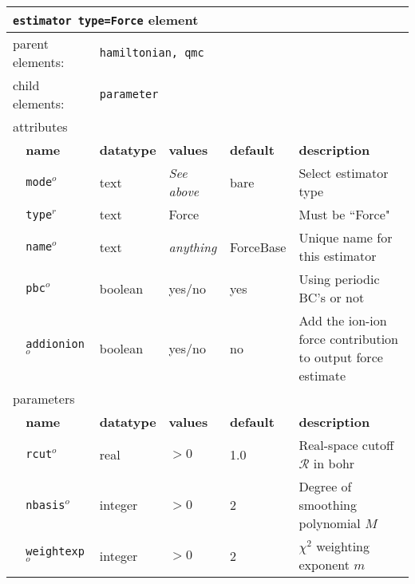 \begin{table}[h]
\begin{center}
\begin{tabularx}{\textwidth}{l l l l l X }
\hline
\multicolumn{6}{l}{\texttt{estimator type=Force} element} \\
\hline
\multicolumn{2}{l}{parent elements:} & \multicolumn{4}{l}{\texttt{hamiltonian, qmc}}\\
\multicolumn{2}{l}{child  elements:} & \multicolumn{4}{l}{\texttt{parameter}}\\
\multicolumn{2}{l}{attributes}  & \multicolumn{4}{l}{}\\
   & \bfseries name       & \bfseries datatype & \bfseries values  & \bfseries default   & \bfseries description \\
   &   \texttt{mode}$^o$      &  text              & \textit{See above}        & bare          & Select estimator type\\
   &   \texttt{type}$^r$      &  text              &  Force            &               & Must be ``Force"         \\
   &   \texttt{name}$^o$      &  text              & \textit{anything}         & ForceBase     & Unique name for this estimator\\
   &   \texttt{pbc}$^o$       &  boolean           & yes/no                    & yes           & Using periodic BC's or not\\
   &   \texttt{addionion}$^o$       &  boolean           & yes/no                    & no           & Add the ion-ion force contribution to output force estimate   \\
   \multicolumn{2}{l}{parameters}  & \multicolumn{4}{l}{}\\
   & \bfseries name       & \bfseries datatype & \bfseries values  & \bfseries default   & \bfseries description \\
   &   \texttt{rcut}$^o$      &  real             & $> 0$        & 1.0         & Real-space cutoff $\mathcal{R}$ in bohr\\
   &   \texttt{nbasis}$^o$      &  integer              & $> 0 $           &  2            & Degree of smoothing polynomial $M$ \\
   &   \texttt{weightexp}$^o$      &  integer              &$ > 0$         & 2    & $\chi^2$ weighting exponent $m$\\  
  \hline
\end{tabularx}
\end{center}
\end{table}
\FloatBarrier

